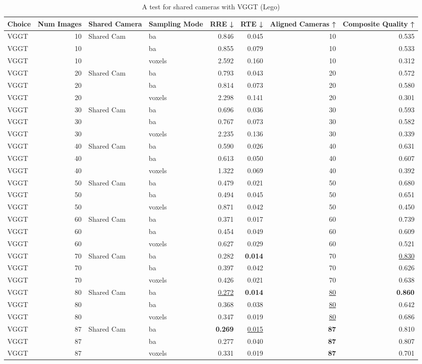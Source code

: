 \begin{table}[H]
\caption{A test for shared cameras with VGGT (Lego)}
\label{tab:06_shared_camera_vggt_lego}
\begin{tabular}{lrllrrrr}
\toprule
Choice & Num Images & Shared Camera & Sampling Mode & RRE ↓ & RTE ↓ & Aligned Cameras ↑ & Composite Quality ↑ \\
\midrule
VGGT & 10 & Shared Cam & ba & 0.846 & 0.045 & 10 & 0.535 \\
VGGT & 10 &  & ba & 0.855 & 0.079 & 10 & 0.533 \\
VGGT & 10 &  & voxels & 2.592 & 0.160 & 10 & 0.312 \\
VGGT & 20 & Shared Cam & ba & 0.793 & 0.043 & 20 & 0.572 \\
VGGT & 20 &  & ba & 0.814 & 0.073 & 20 & 0.580 \\
VGGT & 20 &  & voxels & 2.298 & 0.141 & 20 & 0.301 \\
VGGT & 30 & Shared Cam & ba & 0.696 & 0.036 & 30 & 0.593 \\
VGGT & 30 &  & ba & 0.767 & 0.073 & 30 & 0.582 \\
VGGT & 30 &  & voxels & 2.235 & 0.136 & 30 & 0.339 \\
VGGT & 40 & Shared Cam & ba & 0.590 & 0.026 & 40 & 0.631 \\
VGGT & 40 &  & ba & 0.613 & 0.050 & 40 & 0.607 \\
VGGT & 40 &  & voxels & 1.322 & 0.069 & 40 & 0.392 \\
VGGT & 50 & Shared Cam & ba & 0.479 & 0.021 & 50 & 0.680 \\
VGGT & 50 &  & ba & 0.494 & 0.045 & 50 & 0.651 \\
VGGT & 50 &  & voxels & 0.871 & 0.042 & 50 & 0.450 \\
VGGT & 60 & Shared Cam & ba & 0.371 & 0.017 & 60 & 0.739 \\
VGGT & 60 &  & ba & 0.454 & 0.049 & 60 & 0.609 \\
VGGT & 60 &  & voxels & 0.627 & 0.029 & 60 & 0.521 \\
VGGT & 70 & Shared Cam & ba & 0.282 & \textbf{0.014} & 70 & \underline{0.830} \\
VGGT & 70 &  & ba & 0.397 & 0.042 & 70 & 0.626 \\
VGGT & 70 &  & voxels & 0.426 & 0.021 & 70 & 0.638 \\
VGGT & 80 & Shared Cam & ba & \underline{0.272} & \textbf{0.014} & \underline{80} & \textbf{0.860} \\
VGGT & 80 &  & ba & 0.368 & 0.038 & \underline{80} & 0.642 \\
VGGT & 80 &  & voxels & 0.347 & 0.019 & \underline{80} & 0.686 \\
VGGT & 87 & Shared Cam & ba & \textbf{0.269} & \underline{0.015} & \textbf{87} & 0.810 \\
VGGT & 87 &  & ba & 0.277 & 0.040 & \textbf{87} & 0.807 \\
VGGT & 87 &  & voxels & 0.331 & 0.019 & \textbf{87} & 0.701 \\
\bottomrule
\end{tabular}
\end{table}
